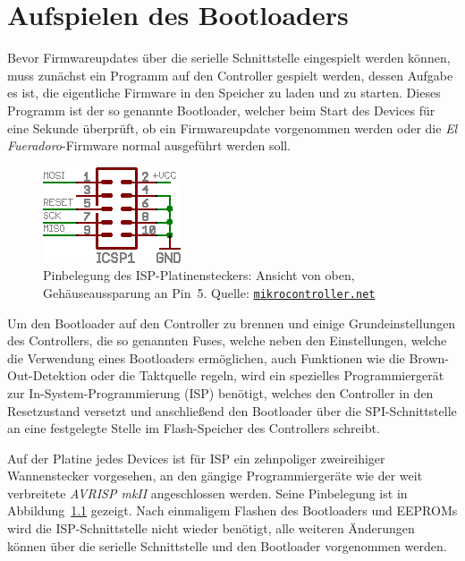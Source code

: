 \documentclass[paper=a4, parskip, numbers=noenddot, toc=listof, headsepline]{scrbook}
\newcommand{\anlage}{\emph{El Fueradoro}}
\begin{document}
	\chapter{Aufspielen des Bootloaders}
		\label{ch:bootloader}

		Bevor Firmwareupdates über die serielle Schnittstelle eingespielt werden können, muss zunächst ein Programm auf den Controller gespielt werden, dessen Aufgabe es ist, die eigentliche Firmware in den Speicher zu laden und zu starten. Dieses Programm ist der so genannte Bootloader, welcher beim Start des Devices für eine Sekunde überprüft, ob ein Firmwareupdate vorgenommen werden oder die {\anlage}-Firmware normal ausgeführt werden soll.

		\begin{figure}[!h]
			\centering
			\includegraphics[width=.35\textwidth]{Bilder/isp}
			\caption{Pinbelegung des ISP-Platinensteckers: Ansicht von oben, Gehäuseaussparung an Pin~5. Quelle: \href{http://www.mikrocontroller.net}{\texttt{mikrocontroller.net}}}
			\label{fig:isp}
		\end{figure}

		Um den Bootloader auf den Controller zu brennen und einige Grundeinstellungen des Controllers, die so genannten Fuses, welche neben den Einstellungen, welche die Verwendung eines Bootloaders ermöglichen, auch Funktionen wie die Brown-Out-Detektion oder die Taktquelle regeln, wird ein spezielles Programmiergerät zur In-System-Programmierung (ISP) benötigt, welches den Controller in den Resetzustand versetzt und anschließend den Bootloader über die SPI-Schnittstelle an eine festgelegte Stelle im Flash-Speicher des Controllers schreibt.

		Auf der Platine jedes Devices ist für ISP ein zehnpoliger zweireihiger Wannenstecker vorgesehen, an den gängige Programmiergeräte wie der weit verbreitete \emph{AVRISP mkII} angeschlossen werden. Seine Pinbelegung ist in Abbildung~\ref{fig:isp} gezeigt. Nach einmaligem Flashen des Bootloaders und EEPROMs wird die ISP-Schnittstelle nicht wieder benötigt, alle weiteren Änderungen können über die serielle Schnittstelle und den Bootloader vorgenommen werden.
\end{document}
